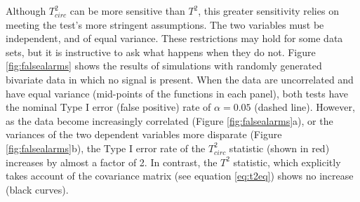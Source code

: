 \documentclass[]{article}
\begin{document}
Although \(T^2_{circ}\) can be more sensitive than \(T^2\), this greater sensitivity relies on meeting the test's more stringent assumptions. The two variables must be independent, and of equal variance. These restrictions may hold for some data sets, but it is instructive to ask what happens when they do not. Figure \ref{fig:falsealarms} shows the results of simulations with randomly generated bivariate data in which no signal is present. When the data are uncorrelated and have equal variance (mid-points of the functions in each panel), both tests have the nominal Type I error (false positive) rate of \(\alpha = 0.05\) (dashed line). However, as the data become increasingly correlated (Figure \ref{fig:falsealarms}a), or the variances of the two dependent variables more disparate (Figure \ref{fig:falsealarms}b), the Type I error rate of the \(T^2_{circ}\) statistic (shown in red) increases by almost a factor of 2. In contrast, the \(T^2\) statistic, which explicitly takes account of the covariance matrix (see equation \eqref{eq:t2eq}) shows no increase (black curves).
\end{document}
